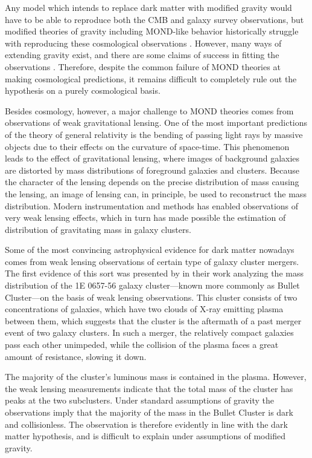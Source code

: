 \documentclass[b5paper, 10pt, twoside]{book}
\begin{document}
Any model which intends to replace dark matter with modified gravity would have to be able to reproduce both the CMB and galaxy survey observations, but modified theories of gravity including MOND-like behavior historically struggle with reproducing these cosmological observations \parencites{XuWangZhang2015, TanWoodard2018, ZlosnikSkordis2017}. However, many ways of extending gravity exist, and there are some claims of success in fitting the observations \parencite{SkordisZlosnik2021}. Therefore, despite the common failure of MOND theories at making cosmological predictions, it remains difficult to completely rule out the hypothesis on a purely cosmological basis.

Besides cosmology, however, a major challenge to MOND theories comes from observations of weak gravitational lensing. One of the most important predictions of the theory of general relativity is the bending of passing light rays by massive objects due to their effects on the curvature of space-time. This phenomenon leads to the effect of gravitational lensing, where images of background galaxies are distorted by mass distributions of foreground galaxies and clusters. Because the character of the lensing depends on the precise distribution of mass causing the lensing, an image of lensing can, in principle, be used to reconstruct the mass distribution. Modern instrumentation and methods has enabled observations of very weak lensing effects, which in turn has made possible the estimation of distribution of gravitating mass in galaxy clusters.

Some of the most convincing astrophysical evidence for dark matter nowadays comes from weak lensing observations of certain type of galaxy cluster mergers. The first evidence of this sort was presented by \textcite{CloweEtAl2006} in their work analyzing the mass distribution of the 1E 0657-56 galaxy cluster---known more commonly as Bullet Cluster---on the basis of weak lensing observations. This cluster consists of two concentrations of galaxies, which have two clouds of X-ray emitting plasma between them, which suggests that the cluster is the aftermath of a past merger event of two galaxy clusters. In such a merger, the relatively compact galaxies pass each other unimpeded, while the collision of the plasma faces a great amount of resistance, slowing it down.

The majority of the cluster's luminous mass is contained in the plasma. However, the weak lensing measurements indicate that the total mass of the cluster has peaks at the two subclusters. Under standard assumptions of gravity the observations imply that the majority of the mass in the Bullet Cluster is dark and collisionless. The observation is therefore evidently in line with the dark matter hypothesis, and is difficult to explain under assumptions of modified gravity.
\end{document}
